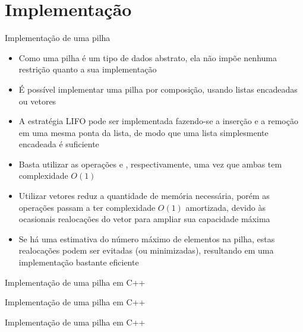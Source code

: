 \section{Implementação}

\begin{frame}[fragile]{Implementação de uma pilha}

    \begin{itemize}
        \item Como uma pilha é um tipo de dados abstrato, ela não impõe nenhuma restrição
            quanto a sua implementação

        \item É possível implementar uma pilha por composição, usando listas encadeadas ou vetores

        \item A estratégia LIFO pode ser implementada fazendo-se a inserção e a remoção em uma
            mesma ponta da lista, de modo que uma lista simplesmente encadeada é suficiente

        \item Basta utilizar as operações  e , 
            respectivamente, uma vez que ambas tem complexidade $O(1)$

        \item Utilizar vetores reduz a quantidade de memória necessária, porém as operações passam
            a ter complexidade $O(1)$ amortizada, devido às ocasionais realocações do vetor para
            ampliar sua capacidade máxima

        \item Se há uma estimativa do número máximo de elementos na pilha, estas realocações
            podem ser evitadas (ou minimizadas), resultando em uma implementação bastante
            eficiente
    \end{itemize}

\end{frame}

\begin{frame}[fragile]{Implementação de uma pilha em C++}
\end{frame}

\begin{frame}[fragile]{Implementação de uma pilha em C++}
\end{frame}

\begin{frame}[fragile]{Implementação de uma pilha em C++}
\end{frame}

